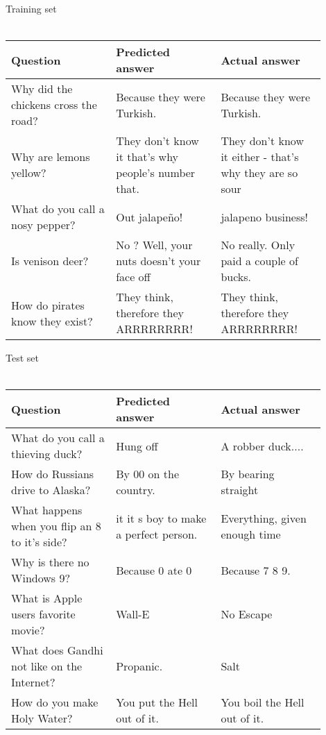 \documentclass[12pt]{article}
\begin{document}
Training set\\\\
\begin{tabular}{ |p{0.3\linewidth}|p{0.3\linewidth}|p{0.3\linewidth}| } 
     \hline
      \textbf{Question} & \textbf{Predicted answer} & \textbf{Actual answer} \\ 
     \hline
       Why did the chickens cross the road? & Because they were Turkish. & Because they were Turkish. \\ 
     \hline
        Why are lemons yellow? & They don't know it that's why people's number that. & They don't know it either - that's why they are so sour  \\
     \hline
        What do you call a nosy pepper? & Out jalapeño! & jalapeno business! \\
     \hline
        Is venison deer? & No ? Well, your nuts doesn’t your face off & No really. Only paid a couple of bucks. \\ 
     \hline
         How do pirates know they exist? & They think, therefore they ARRRRRRRR! & They think, therefore they ARRRRRRRR! \\
         \hline
\end{tabular}

\vspace{1cm}
Test set \\\\
\begin{tabular}{ |p{0.3\linewidth}|p{0.3\linewidth}|p{0.3\linewidth}| } 
         \hline
               \textbf{Question} & \textbf{Predicted answer} & \textbf{Actual answer} \\
     \hline
       What do you call a thieving duck? & Hung off & A robber duck.... \\ 
     \hline
        How do Russians drive to Alaska? & By 00 on the country. & By bearing straight \\
     \hline
        What happens when you flip an 8 to it's side? & it it s boy to make a perfect person. & Everything, given enough time \\
     \hline
        Why is there no Windows 9? & Because 0 ate 0 & Because 7 8 9. \\
     \hline
        What is Apple users favorite movie? & Wall-E & No Escape \\
     \hline
        What does Gandhi not like on the Internet? & Propanic. & Salt \\
     \hline
        How do you make Holy Water? & You put the Hell out of it. & You boil the Hell out of it. \\
     \hline
\end{tabular}
\end{document}
